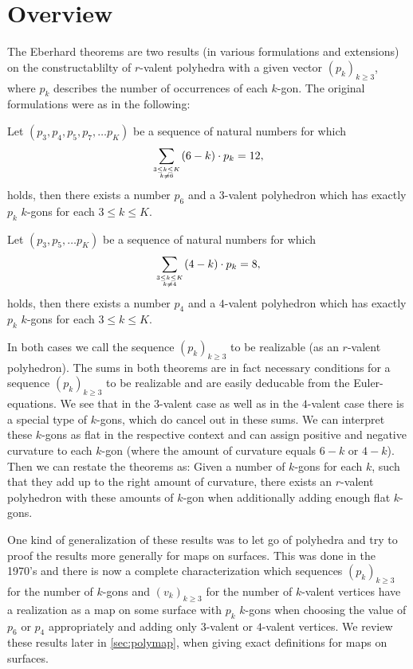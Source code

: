 \section{Overview}

The {\sc Eberhard} theorems are two results (in various formulations and extensions) on the constructablilty of $r$-valent polyhedra with a given vector $(p_k)_{k \geq 3}$, where $p_k$ describes the number of occurrences of each $k$-gon. The original formulations were as in the following:
\begin{theorem}\label{thm:eberhard:3} Let $(p_3, p_4, p_5, p_7, \dots p_K)$ be a sequence of natural numbers for which
\begin{align*}
  \sum_{3 \leq k \leq K \atop k \neq 6}(6 - k) \cdot p_k = 12,
\end{align*}
holds, then there exists a number $p_6$ and a $3$-valent polyhedron which has exactly $p_k$ $k$-gons for each $3 \leq k \leq K$.
\end{theorem}
\begin{theorem}\label{thm:eberhard:4} Let $(p_3,  p_5, \dots p_K)$ be a sequence of natural numbers for which
\begin{align*}
  \sum_{3 \leq k \leq K \atop k \neq 4}(4 - k) \cdot p_k = 8,
\end{align*}
holds, then there exists a number $p_4$ and a $4$-valent polyhedron which has exactly $p_k$ $k$-gons for each $3 \leq k \leq K$.
\end{theorem}

In both cases we call the sequence $(p_k)_{k \geq 3}$ to be realizable (as an $r$-valent polyhedron). The sums in both theorems are in fact necessary conditions for a sequence $(p_k)_{k \geq 3}$ to be realizable and are easily deducable from the {\sc Euler}-equations. We see that in the $3$-valent case as well as in the $4$-valent case there is a special type of $k$-gons, which do cancel out in these sums. We can interpret these $k$-gons as flat in the respective context and can assign positive and negative curvature to each $k$-gon (where the amount of curvature equals $6 - k$ or $4 - k$). Then we can restate the theorems as: Given a number of $k$-gons for each $k$, such that they add up to the right amount of curvature, there exists an $r$-valent polyhedron with these amounts of $k$-gon when additionally adding enough flat $k$-gons.

One kind of generalization of these results was to let go of polyhedra and try to proof the results more generally for maps on surfaces. This was done in the 1970's and there is now a complete characterization which sequences $(p_k)_{k\geq 3}$ for the number of $k$-gons and $(v_k)_{k \geq 3}$ for the number of $k$-valent vertices have a realization as a map on some surface with $p_k$ $k$-gons when choosing the value of $p_6$ or $p_4$ appropriately and adding only $3$-valent or $4$-valent vertices. We review these results later in \autoref{sec:polymap}, when giving exact definitions for maps on surfaces.

